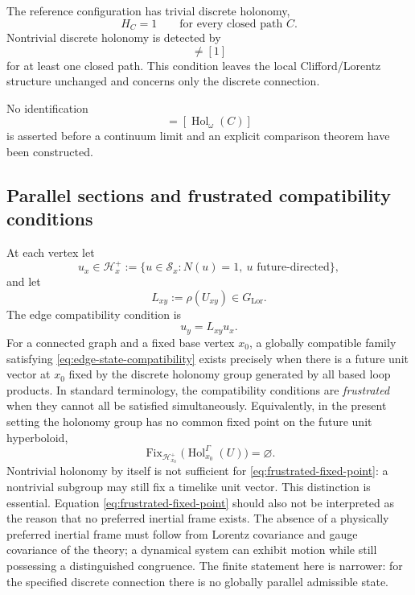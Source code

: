 \documentclass[11pt,a4paper]{article}
\theoremstyle{remark}
\newcommand{\LorG}{G_{\mathrm{Lor}}}
\newcommand{\Smodel}{\mathcal S}
\newcommand{\Hol}{\operatorname{Hol}}
\begin{document}
The reference configuration has trivial discrete holonomy,
\begin{equation}
  H_C=1
  \qquad
  \text{for every closed path }C.
\tag{5.6}
\end{equation}
Nontrivial discrete holonomy is detected by
\begin{equation}
  [H_C]\neq[1]
\tag{5.7}
\end{equation}
for at least one closed path.  This condition leaves the local Clifford/Lorentz structure unchanged and concerns only the discrete connection.

No identification
\begin{equation}
  [H_C]=[\Hol_{\omega}(C)]
\tag{5.8}
\end{equation}
is asserted before a continuum limit and an explicit comparison theorem have been constructed.


\subsection{Parallel sections and frustrated compatibility conditions}

At each vertex let
\begin{equation}
  u_x\in\mathcal H_x^+
  :=\{u\in\Smodel_x:N(u)=1,\ u\text{ future-directed}\},
\tag{5.9}
\end{equation}
and let
\begin{equation}
  L_{xy}:=\rho(U_{xy})\in\LorG.
\tag{5.10}
\end{equation}
The edge compatibility condition is
\begin{equation}
  u_y=L_{xy}u_x.
\tag{5.11}\label{eq:edge-state-compatibility}
\end{equation}
For a connected graph and a fixed base vertex \(x_0\), a globally compatible family satisfying \eqref{eq:edge-state-compatibility} exists precisely when there is a future unit vector at \(x_0\) fixed by the discrete holonomy group generated by all based loop products.  In standard terminology, the compatibility conditions are \emph{frustrated} when they cannot all be satisfied simultaneously.  Equivalently, in the present setting the holonomy group has no common fixed point on the future unit hyperboloid,
\begin{equation}
  \operatorname{Fix}_{\mathcal H_{x_0}^+}
  \bigl(\Hol_{x_0}^{\Gamma}(U)\bigr)
  =\varnothing.
\tag{5.12}\label{eq:frustrated-fixed-point}
\end{equation}
Nontrivial holonomy by itself is not sufficient for \eqref{eq:frustrated-fixed-point}: a nontrivial subgroup may still fix a timelike unit vector.  This distinction is essential.  Equation \eqref{eq:frustrated-fixed-point} should also not be interpreted as the reason that no preferred inertial frame exists.  The absence of a physically preferred inertial frame must follow from Lorentz covariance and gauge covariance of the theory; a dynamical system can exhibit motion while still possessing a distinguished congruence.  The finite statement here is narrower: for the specified discrete connection there is no globally parallel admissible state.
\end{document}
